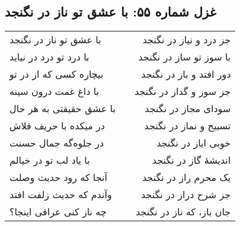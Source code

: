 \begin{center}
\section*{غزل شماره ۵۵: با عشق تو ناز در نگنجد}
\label{sec:055}
\begin{longtable}{l p{0.5cm} r}
با عشق تو ناز در نگنجد
&&
جز درد و نیاز در نگنجد
\\
با درد تو درد در نیاید
&&
با سوز تو ساز در نگنجد
\\
بیچاره کسی که از در تو
&&
دور افتد و باز در نگنجد
\\
با داغ غمت درون سینه
&&
جز سوز و گداز در نگنجد
\\
با عشق حقیقتی به هر حال
&&
سودای مجاز در نگنجد
\\
در میکده با حریف قلاش
&&
تسبیح و نماز در نگنجد
\\
در جلوه‌گه جمال حسنت
&&
خوبی ایاز در نگنجد
\\
با یاد لب تو در خیالم
&&
اندیشهٔ گاز در نگنجد
\\
آنجا که رود حدیث وصلت
&&
یک محرم راز در نگنجد
\\
وآندم که حدیث زلفت افتد
&&
جز شرح دراز در نگنجد
\\
چه ناز کنی عراقی اینجا؟
&&
جان باز، که ناز در نگنجد
\\
\end{longtable}
\end{center}
